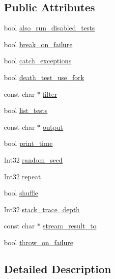 \subsection*{\-Public \-Attributes}
\begin{DoxyCompactItemize}
\item 
bool \hyperlink{structtesting_1_1Flags_a9f1e8994d4557bb5f91182c886811e9d}{also\-\_\-run\-\_\-disabled\-\_\-tests}
\item 
bool \hyperlink{structtesting_1_1Flags_a83b5162073d12b7c0d5575e138d64212}{break\-\_\-on\-\_\-failure}
\item 
bool \hyperlink{structtesting_1_1Flags_a3e37b9f64e370d347c742271df284bcc}{catch\-\_\-exceptions}
\item 
bool \hyperlink{structtesting_1_1Flags_ad58842825558188c2ae9a798f2ea4906}{death\-\_\-test\-\_\-use\-\_\-fork}
\item 
const char $\ast$ \hyperlink{structtesting_1_1Flags_acd59a575aad953e589ee17c17d7691bc}{filter}
\item 
bool \hyperlink{structtesting_1_1Flags_ab0b0822704f0f95b24c601775241cdd0}{list\-\_\-tests}
\item 
const char $\ast$ \hyperlink{structtesting_1_1Flags_a5a832fe6e2412dfabb93a2adae30e745}{output}
\item 
bool \hyperlink{structtesting_1_1Flags_aae09f92702205b07abd2550a2a6e4abc}{print\-\_\-time}
\item 
\-Int32 \hyperlink{structtesting_1_1Flags_aeb96806e7c2121849ca67ce6b688dd34}{random\-\_\-seed}
\item 
\-Int32 \hyperlink{structtesting_1_1Flags_af605e37f40178778020faf803094b25d}{repeat}
\item 
bool \hyperlink{structtesting_1_1Flags_a6e3f5f03c7b0b6a6153e16d38f2ab04d}{shuffle}
\item 
\-Int32 \hyperlink{structtesting_1_1Flags_a153584a7bc86c558b8e22e5bbc9bfc31}{stack\-\_\-trace\-\_\-depth}
\item 
const char $\ast$ \hyperlink{structtesting_1_1Flags_aeeca9cdf2aff763dc87db480033768a7}{stream\-\_\-result\-\_\-to}
\item 
bool \hyperlink{structtesting_1_1Flags_a46c8d0dfe16e27106e4794dfcd7b821c}{throw\-\_\-on\-\_\-failure}
\end{DoxyCompactItemize}


\subsection{\-Detailed \-Description}


